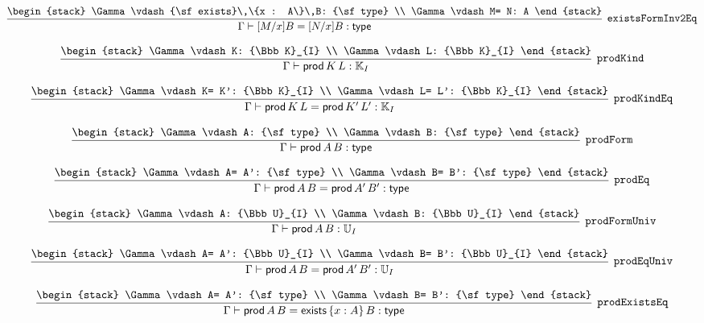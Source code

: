 \[
\infer[{\tt existsFormInv2Eq}]{\Gamma \vdash [M/x]B= [N/x]B: {\sf type}}{
\begin{stack}
\Gamma \vdash {\sf exists}\,\{x : A\}\,B: {\sf type}
\\
\Gamma \vdash M= N: A
\end{stack}}
\]

\[
\infer[{\tt prodKind}]{\Gamma \vdash {\sf prod}\,K\,L: {\Bbb K}_{I}}{
\begin{stack}
\Gamma \vdash K: {\Bbb K}_{I}
\\
\Gamma \vdash L: {\Bbb K}_{I}
\end{stack}}
\]

\[
\infer[{\tt prodKindEq}]{\Gamma \vdash {\sf prod}\,K\,L= {\sf prod}\,K'\,L': {\Bbb K}_{I}}{
\begin{stack}
\Gamma \vdash K= K': {\Bbb K}_{I}
\\
\Gamma \vdash L= L': {\Bbb K}_{I}
\end{stack}}
\]

\[
\infer[{\tt prodForm}]{\Gamma \vdash {\sf prod}\,A\,B: {\sf type}}{
\begin{stack}
\Gamma \vdash A: {\sf type}
\\
\Gamma \vdash B: {\sf type}
\end{stack}}
\]

\[
\infer[{\tt prodEq}]{\Gamma \vdash {\sf prod}\,A\,B= {\sf prod}\,A'\,B': {\sf type}}{
\begin{stack}
\Gamma \vdash A= A': {\sf type}
\\
\Gamma \vdash B= B': {\sf type}
\end{stack}}
\]

\[
\infer[{\tt prodFormUniv}]{\Gamma \vdash {\sf prod}\,A\,B: {\Bbb U}_{I}}{
\begin{stack}
\Gamma \vdash A: {\Bbb U}_{I}
\\
\Gamma \vdash B: {\Bbb U}_{I}
\end{stack}}
\]

\[
\infer[{\tt prodEqUniv}]{\Gamma \vdash {\sf prod}\,A\,B= {\sf prod}\,A'\,B': {\Bbb U}_{I}}{
\begin{stack}
\Gamma \vdash A= A': {\Bbb U}_{I}
\\
\Gamma \vdash B= B': {\Bbb U}_{I}
\end{stack}}
\]

\[
\infer[{\tt prodExistsEq}]{\Gamma \vdash {\sf prod}\,A\,B= {\sf exists}\,\{x : A\}\,B: {\sf type}}{
\begin{stack}
\Gamma \vdash A= A': {\sf type}
\\
\Gamma \vdash B= B': {\sf type}
\end{stack}}
\]

